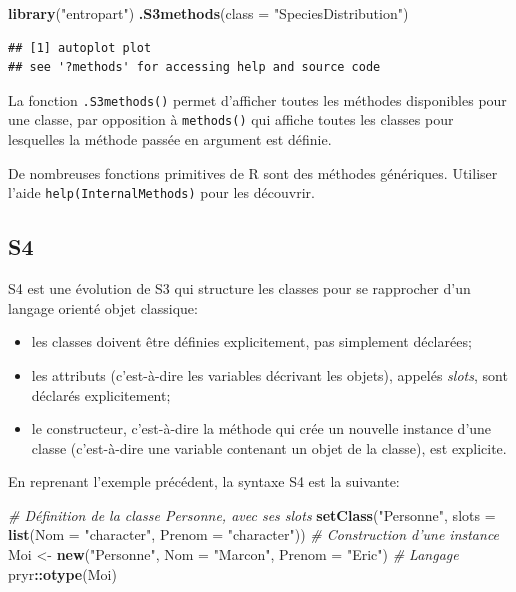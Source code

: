 \documentclass[
  12pt,
  french,
  a4paper,
  extrafontsizes,onecolumn,openright
  ]{memoir}
\newenvironment{Shaded}{\begin{snugshade}}{\end{snugshade}}
\newcommand{\CommentTok}[1]{\textcolor[rgb]{0.56,0.35,0.01}{\textit{#1}}}
\newcommand{\DataTypeTok}[1]{\textcolor[rgb]{0.13,0.29,0.53}{#1}}
\newcommand{\KeywordTok}[1]{\textcolor[rgb]{0.13,0.29,0.53}{\textbf{#1}}}
\newcommand{\NormalTok}[1]{#1}
\newcommand{\OperatorTok}[1]{\textcolor[rgb]{0.81,0.36,0.00}{\textbf{#1}}}
\newcommand{\StringTok}[1]{\textcolor[rgb]{0.31,0.60,0.02}{#1}}
\providecommand{\tightlist}{%
  \setlength{\itemsep}{0pt}\setlength{\parskip}{0pt}}
\begin{document}
\begin{Shaded}
\begin{Highlighting}[]
\KeywordTok{library}\NormalTok{(}\StringTok{"entropart"}\NormalTok{)}
\KeywordTok{.S3methods}\NormalTok{(}\DataTypeTok{class =} \StringTok{"SpeciesDistribution"}\NormalTok{)}
\end{Highlighting}
\end{Shaded}

\begin{verbatim}
## [1] autoplot plot    
## see '?methods' for accessing help and source code
\end{verbatim}

\normalsize
La fonction \texttt{.S3methods()} permet d'afficher toutes les méthodes disponibles pour une classe, par opposition à \texttt{methods()} qui affiche toutes les classes pour lesquelles la méthode passée en argument est définie.

De nombreuses fonctions primitives de R sont des méthodes génériques.
Utiliser l'aide \texttt{help(InternalMethods)} pour les découvrir.

\hypertarget{s4}{%
\subsection{S4}\label{s4}}

S4 est une évolution de S3 qui structure les classes pour se rapprocher d'un langage orienté objet classique:

\begin{itemize}
\tightlist
\item
  les classes doivent être définies explicitement, pas simplement déclarées;
\item
  les attributs (c'est-à-dire les variables décrivant les objets), appelés \emph{slots}, sont déclarés explicitement;
\item
  le constructeur, c'est-à-dire la méthode qui crée un nouvelle instance d'une classe (c'est-à-dire une variable contenant un objet de la classe), est explicite.
\end{itemize}

En reprenant l'exemple précédent, la syntaxe S4 est la suivante:

\scriptsize

\begin{Shaded}
\begin{Highlighting}[]
\CommentTok{# Définition de la classe Personne, avec ses slots}
\KeywordTok{setClass}\NormalTok{(}\StringTok{"Personne"}\NormalTok{,  }
         \DataTypeTok{slots =} \KeywordTok{list}\NormalTok{(}\DataTypeTok{Nom =} \StringTok{"character"}\NormalTok{, }\DataTypeTok{Prenom =} \StringTok{"character"}\NormalTok{))}
\CommentTok{# Construction d'une instance}
\NormalTok{Moi <-}\StringTok{ }\KeywordTok{new}\NormalTok{(}\StringTok{"Personne"}\NormalTok{, }\DataTypeTok{Nom =} \StringTok{"Marcon"}\NormalTok{, }\DataTypeTok{Prenom =} \StringTok{"Eric"}\NormalTok{)}
\CommentTok{# Langage}
\NormalTok{pryr}\OperatorTok{::}\KeywordTok{otype}\NormalTok{(Moi)}
\end{Highlighting}
\end{Shaded}
\end{document}

